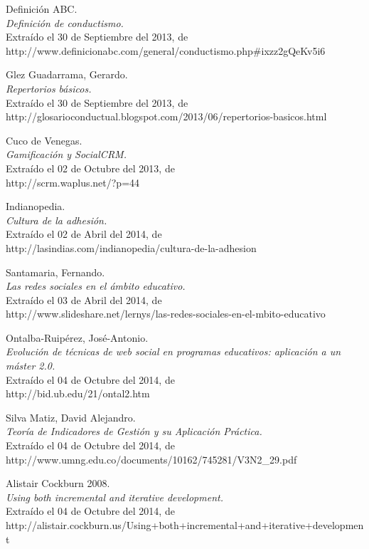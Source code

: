 \begin{thebibliography}{99}
 Definición ABC.\\
\emph{Definición de conductismo.}\\
Extraído el 30 de Septiembre del 2013, de\\
http://www.definicionabc.com/general/conductismo.php\#ixzz2gQeKv5i6

 Glez Guadarrama, Gerardo.\\
\emph{Repertorios básicos.}\\
Extraído el 30 de Septiembre del 2013, de\\
http://glosarioconductual.blogspot.com/2013/06/repertorios-basicos.html

 Cuco de Venegas.\\
\emph{Gamificación y SocialCRM.}\\
Extraído el 02 de Octubre del 2013, de\\
http://scrm.waplus.net/?p=44

 Indianopedia.\\
\emph{Cultura de la adhesión.}\\
Extraído el 02 de Abril del 2014, de\\
http://lasindias.com/indianopedia/cultura-de-la-adhesion

 Santamaria, Fernando.\\
\emph{Las redes sociales en el ámbito educativo.}\\
Extraído el 03 de Abril del 2014, de\\
http://www.slideshare.net/lernys/las-redes-sociales-en-el-mbito-educativo

 Ontalba-Ruipérez, José-Antonio.\\
\emph{Evolución de técnicas de web social en programas educativos: aplicación a
un máster 2.0.}\\
Extraído el 04 de Octubre del 2014, de\\
http://bid.ub.edu/21/ontal2.htm

 Silva Matiz, David Alejandro.\\
\emph{Teoría de Indicadores de Gestión y su Aplicación Práctica.}\\
Extraído el 04 de Octubre del 2014, de\\
http://www.umng.edu.co/documents/10162/745281/V3N2\_29.pdf

 Alistair Cockburn 2008.\\
\emph{Using both incremental and iterative development.}\\
Extraído el 04 de Octubre del 2014, de\\
http://alistair.cockburn.us/Using+both+incremental+and+iterative+development

\end{thebibliography}
